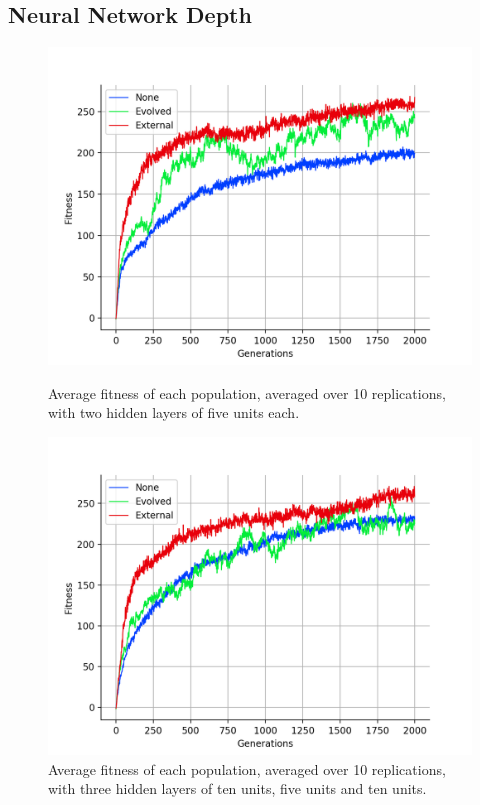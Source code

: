 \documentclass[12pt,a4paper,twoside,openright]{report}
\begin{document}
\subsection{Neural Network Depth}

\begin{figure}[t]
   \centering
   \begin{minipage}{0.49\textwidth}
          \centering
          \captionsetup{width=.9\linewidth}
          \includegraphics[width=1.\linewidth]{results/average-55.png}
          \caption{Average fitness of each population, averaged over 10 replications, with two hidden layers of five units each.}
          \label{fig:average-55}
   \end{minipage}
   \begin{minipage}{0.49\textwidth}
          \centering
          \captionsetup{width=.9\linewidth}
          \includegraphics[width=1.\linewidth]{results/average-10510.png}
          \caption{Average fitness of each population, averaged over 10 replications, with three hidden layers of ten units, five units and ten units.}
          \label{fig:average-10510}
   \end{minipage}
\end{figure}
\end{document}
